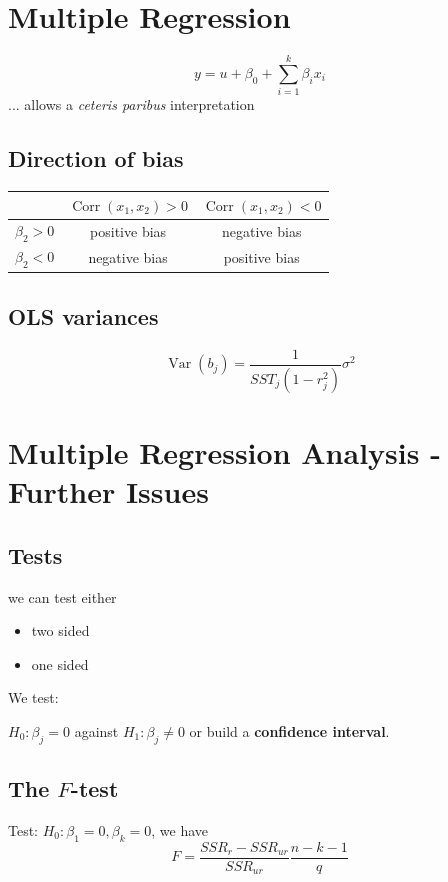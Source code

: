 \documentclass[a4paper,titlepage] {scrartcl}
\begin{document}
\section{Multiple Regression}
\begin{equation}
	y= u + \beta_0 +\sum_{i=1}^k\beta_ix_i
\end{equation}
... allows a \emph{ceteris paribus} interpretation

\subsection{Direction of bias}
\begin{tabular}{ccc}
\hline
 & $\operatorname{Corr}(x_1,x_2)>0$ & $\operatorname{Corr}(x_1,x_2)<0$\\
\hline
$\beta_2>0$ & positive bias & negative bias\\
\hline
$\beta_2<0$ & negative bias & positive bias\\
\hline
\end{tabular}

\subsection{OLS variances}
\begin{equation}
	\operatorname{Var}(b_j)= \frac{1}{SST_j(1-r_j^2)}\sigma^2
\end{equation}

\section{Multiple Regression Analysis - Further Issues}

\subsection{Tests}
we can test either
\begin{itemize}
	\item two sided
	\item one sided
\end{itemize}
We test:

$H_0: \beta_j=0$ against
$H_1: \beta_j\neq0$
or build a \textbf{confidence interval}.


\subsection{The $F$-test}
Test: $H_0: \beta_1=0, \beta_k=0$, we have
\begin{equation}
	F = \frac{SSR_r-SSR_{ur}}{SSR_{ur}}\frac{n-k-1}{q}
\end{equation}
\end{document}
